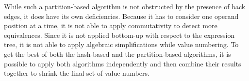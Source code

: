 While such a partition-based algorithm is not obstructed by the presence of back edges, it does have its own deficiencies. 
Because it has to consider one operand position at a time, it is not able to apply commutativity to detect more equivalences. 
Since it is not applied bottom-up with respect to the expression tree, it is not able to apply algebraic simplifications while value numbering. 
To get the best of both the hash-based and the partition-based algorithms, it is possible to apply both algorithms independently and then combine their results together to shrink the final set of value numbers.

%


